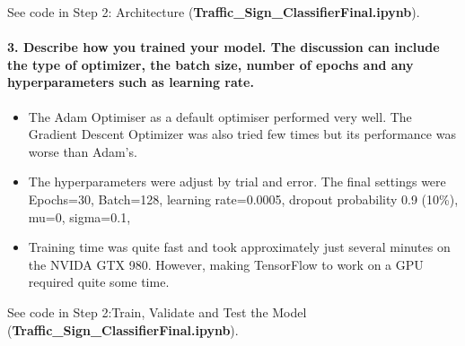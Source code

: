 \documentclass[11pt]{article}
\providecommand{\tightlist}{%
      \setlength{\itemsep}{0pt}\setlength{\parskip}{0pt}}
\begin{document}
See code in Step 2: Architecture
(\textbf{Traffic\_Sign\_ClassifierFinal.ipynb}).

\hypertarget{describe-how-you-trained-your-model.-the-discussion-can-include-the-type-of-optimizer-the-batch-size-number-of-epochs-and-any-hyperparameters-such-as-learning-rate.}{%
\paragraph{3. Describe how you trained your model. The discussion can
include the type of optimizer, the batch size, number of epochs and any
hyperparameters such as learning
rate.}\label{describe-how-you-trained-your-model.-the-discussion-can-include-the-type-of-optimizer-the-batch-size-number-of-epochs-and-any-hyperparameters-such-as-learning-rate.}}

\begin{itemize}
\tightlist
\item
  The Adam Optimiser as a default optimiser performed very well. The
  Gradient Descent Optimizer was also tried few times but its
  performance was worse than Adam's.
\item
  The hyperparameters were adjust by trial and error. The final settings
  were Epochs=30, Batch=128, learning rate=0.0005, dropout probability
  0.9 (10\%), mu=0, sigma=0.1,
\item
  Training time was quite fast and took approximately just several
  minutes on the NVIDA GTX 980. However, making TensorFlow to work on a
  GPU required quite some time.
\end{itemize}

See code in Step 2:Train, Validate and Test the Model
(\textbf{Traffic\_Sign\_ClassifierFinal.ipynb}).
\end{document}
